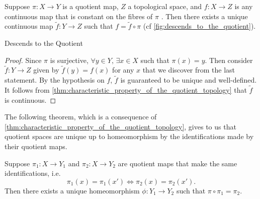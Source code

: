\documentclass[notoc,notitlepage]{tufte-book}
\begin{document}

\begin{thm}\label{thm:descends_to_the_quotient}
  Suppose $\pi : X \to Y$ is a quotient map, $Z$ a topological space, and $f : X \to Z$ is any
  continuous map that is constant on the fibres of $\pi$ . Then there exists a unique continuous map $\tilde{f} : Y
  \to Z$ such that $f = \tilde{f} \circ \pi$ (cf \cref{fig:descends_to_the_quotient}).
  \begin{marginfigure}
    \centering
    \caption{Descends to the Quotient}\label{fig:descends_to_the_quotient}
  \end{marginfigure}
\end{thm}

\begin{proof}
  Since $\pi$ is surjective, $\forall y \in Y, \, \exists x \in X$ such that $\pi(x) = y$. Then
  consider $\tilde{f} : Y \to Z$ given by $\tilde{f}(y) = f(x)$ for any $x$ that we discover from
  the last statement. By the hypothesis on $f$, $\tilde{f}$ is guaranteed to be unique and
  well-defined. It follows from \cref{thm:characteristic_property_of_the_quotient_topology} that
  $\tilde{f}$ is continuous.
\end{proof}

The following theorem, which is a consequence of
\cref{thm:characteristic_property_of_the_quotient_topology}, gives to us that quotient spaces are
unique up to homeomorphism by the identifications made by their quotient maps.

\begin{thm}\label{thm:uniqueness_of_quotient_spaces}
  Suppose $\pi_1 : X \to Y_1$ and $\pi_2 : X \to Y_2$ are quotient maps that make the same
  identifications, i.e.
  \begin{equation*}
    \pi_1(x) = \pi_1(x') \iff \pi_2(x) = \pi_2(x').
  \end{equation*}
  Then there exists a unique homeomorphism $\phi : Y_1 \to Y_2$ such that $\pi \circ \pi_1 =
  \pi_2$.
\end{thm}
\end{document}
